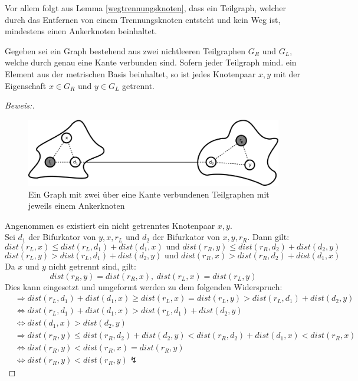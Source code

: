 \begin{bem}
Vor allem folgt aus Lemma \ref{wegtrennungsknoten}, dass ein Teilgraph, welcher durch das Entfernen von einem Trennungsknoten entsteht und kein Weg ist, mindestens einen Ankerknoten beinhaltet.
\end{bem}
\begin{lem}
\label{second_theorem}
Gegeben sei ein Graph bestehend aus zwei nichtleeren Teilgraphen $G_R$ und $G_L$, welche durch genau eine Kante verbunden sind. Sofern jeder Teilgraph mind. ein Element aus der metrischen Basis beinhaltet, so ist jedes Knotenpaar $x,y$ mit der Eigenschaft $x \in G_R$ und $y \in G_L$ getrennt.
\end{lem}
\vspace{-4mm}
\begin{proof}[Beweis:] ~
\vspace{-2mm}
\begin{figure}[h!]
		\centering 		 
  \includegraphics[width=340pt]{bilder/bew5.pdf}
	\caption{Ein Graph mit zwei über eine Kante verbundenen Teilgraphen mit jeweils einem Ankerknoten}
\vspace{-2mm}
  	 \end{figure}
  Angenommen es existiert ein nicht getrenntes Knotenpaar $x,y$.\\Sei $d_1$ der Bifurkator von $y,x,r_L$ und $d_2$ der Bifurkator von $x,y,r_R$. Dann gilt: $$dist(r_L,x) \leq dist(r_L,d_1)+ dist(d_1,x)\text{ und }dist(r_R,y) \leq dist(r_R,d_2)+ dist(d_2,y)$$ $$dist(r_L,y) > dist(r_L,d_1)+ dist(d_2,y)\text{ und }dist(r_R,x) > dist(r_R,d_2)+ dist(d_1,x)$$
  Da $x$ und $y$ nicht getrennt sind, gilt:
   $$dist(r_R,y) =dist(r_R,x),\: dist(r_L,x) = dist(r_L,y)$$ Dies kann eingesetzt und umgeformt werden zu dem folgenden Widerspruch:\begin{align*}
&\Rightarrow dist(r_L,d_1)+ dist(d_1,x) \geq dist(r_L,x) = dist(r_L,y)> dist(r_L,d_1)+ dist(d_2,y)\\
&\Leftrightarrow dist(r_L,d_1)+ dist(d_1,x) > dist(r_L,d_1)+ dist(d_2,y)\\
&\Leftrightarrow dist(d_1,x) >  dist(d_2,y)\\
&\Rightarrow dist(r_R,y) \leq dist(r_R,d_2)+ dist(d_2,y) < dist(r_R,d_2) + dist(d_1,x) < dist(r_R,x)\\
&\Leftrightarrow dist(r_R,y) < dist(r_R,x) = dist(r_R,y)\\&\Leftrightarrow dist(r_R,y) < dist(r_R,y) \lightning
\end{align*}  
   \vspace{-4mm}
  \end{proof}
